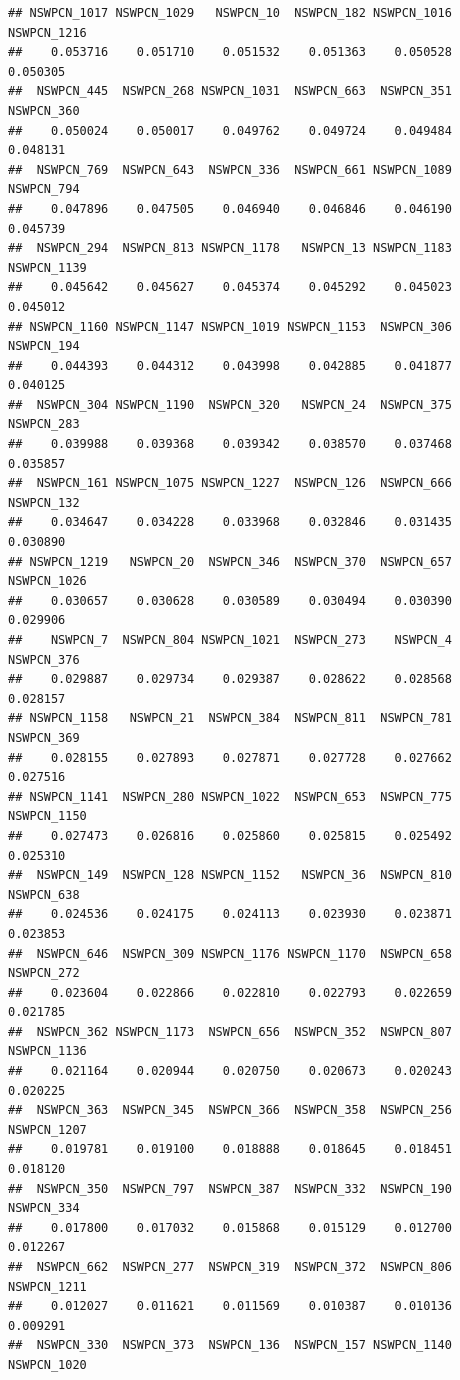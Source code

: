 \documentclass{article}\usepackage[]{graphicx}\usepackage[]{color}
\makeatletter
\newenvironment{kframe}{%
 \def\at@end@of@kframe{}%
 \ifinner\ifhmode%
  \def\at@end@of@kframe{\end{minipage}}%
  \begin{minipage}{\columnwidth}%
 \fi\fi%
 \def\FrameCommand##1{\hskip\@totalleftmargin \hskip-\fboxsep
 \colorbox{shadecolor}{##1}\hskip-\fboxsep
     \hskip-\linewidth \hskip-\@totalleftmargin \hskip\columnwidth}%
 \MakeFramed {\advance\hsize-\width
   \@totalleftmargin\z@ \linewidth\hsize
   \@setminipage}}%
 {\par\unskip\endMakeFramed%
 \at@end@of@kframe}
\newenvironment{knitrout}{}{} %
\makeatother
\begin{document}
\begin{knitrout}
\begin{kframe}
\begin{verbatim}
## NSWPCN_1017 NSWPCN_1029   NSWPCN_10  NSWPCN_182 NSWPCN_1016 NSWPCN_1216 
##    0.053716    0.051710    0.051532    0.051363    0.050528    0.050305 
##  NSWPCN_445  NSWPCN_268 NSWPCN_1031  NSWPCN_663  NSWPCN_351  NSWPCN_360 
##    0.050024    0.050017    0.049762    0.049724    0.049484    0.048131 
##  NSWPCN_769  NSWPCN_643  NSWPCN_336  NSWPCN_661 NSWPCN_1089  NSWPCN_794 
##    0.047896    0.047505    0.046940    0.046846    0.046190    0.045739 
##  NSWPCN_294  NSWPCN_813 NSWPCN_1178   NSWPCN_13 NSWPCN_1183 NSWPCN_1139 
##    0.045642    0.045627    0.045374    0.045292    0.045023    0.045012 
## NSWPCN_1160 NSWPCN_1147 NSWPCN_1019 NSWPCN_1153  NSWPCN_306  NSWPCN_194 
##    0.044393    0.044312    0.043998    0.042885    0.041877    0.040125 
##  NSWPCN_304 NSWPCN_1190  NSWPCN_320   NSWPCN_24  NSWPCN_375  NSWPCN_283 
##    0.039988    0.039368    0.039342    0.038570    0.037468    0.035857 
##  NSWPCN_161 NSWPCN_1075 NSWPCN_1227  NSWPCN_126  NSWPCN_666  NSWPCN_132 
##    0.034647    0.034228    0.033968    0.032846    0.031435    0.030890 
## NSWPCN_1219   NSWPCN_20  NSWPCN_346  NSWPCN_370  NSWPCN_657 NSWPCN_1026 
##    0.030657    0.030628    0.030589    0.030494    0.030390    0.029906 
##    NSWPCN_7  NSWPCN_804 NSWPCN_1021  NSWPCN_273    NSWPCN_4  NSWPCN_376 
##    0.029887    0.029734    0.029387    0.028622    0.028568    0.028157 
## NSWPCN_1158   NSWPCN_21  NSWPCN_384  NSWPCN_811  NSWPCN_781  NSWPCN_369 
##    0.028155    0.027893    0.027871    0.027728    0.027662    0.027516 
## NSWPCN_1141  NSWPCN_280 NSWPCN_1022  NSWPCN_653  NSWPCN_775 NSWPCN_1150 
##    0.027473    0.026816    0.025860    0.025815    0.025492    0.025310 
##  NSWPCN_149  NSWPCN_128 NSWPCN_1152   NSWPCN_36  NSWPCN_810  NSWPCN_638 
##    0.024536    0.024175    0.024113    0.023930    0.023871    0.023853 
##  NSWPCN_646  NSWPCN_309 NSWPCN_1176 NSWPCN_1170  NSWPCN_658  NSWPCN_272 
##    0.023604    0.022866    0.022810    0.022793    0.022659    0.021785 
##  NSWPCN_362 NSWPCN_1173  NSWPCN_656  NSWPCN_352  NSWPCN_807 NSWPCN_1136 
##    0.021164    0.020944    0.020750    0.020673    0.020243    0.020225 
##  NSWPCN_363  NSWPCN_345  NSWPCN_366  NSWPCN_358  NSWPCN_256 NSWPCN_1207 
##    0.019781    0.019100    0.018888    0.018645    0.018451    0.018120 
##  NSWPCN_350  NSWPCN_797  NSWPCN_387  NSWPCN_332  NSWPCN_190  NSWPCN_334 
##    0.017800    0.017032    0.015868    0.015129    0.012700    0.012267 
##  NSWPCN_662  NSWPCN_277  NSWPCN_319  NSWPCN_372  NSWPCN_806 NSWPCN_1211 
##    0.012027    0.011621    0.011569    0.010387    0.010136    0.009291 
##  NSWPCN_330  NSWPCN_373  NSWPCN_136  NSWPCN_157 NSWPCN_1140 NSWPCN_1020 

\end{verbatim}
\end{kframe}
\end{knitrout}
\end{document}
